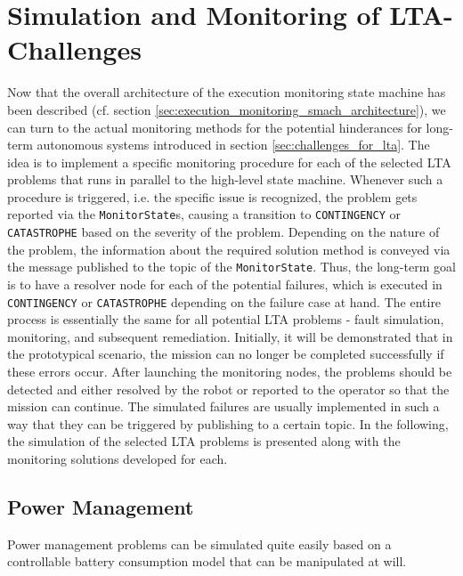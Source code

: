 \documentclass[english, master, utf8]{base/thesis_KBS}
\newcommand{\code}[1]{\colorbox{light-gray}{\texttt{#1}}}
\begin{document}
\section{Simulation and Monitoring of LTA-Challenges}
\label{sec:sim_and_mon_of_lta_challenges}

Now that the overall architecture of the execution monitoring state machine has been described (cf. section \ref{sec:execution_monitoring_smach_architecture}), we can turn to the
actual monitoring methods for the potential hinderances for long-term autonomous systems introduced in section \ref{sec:challenges_for_lta}. The idea is to implement a specific
monitoring procedure for each of the selected LTA problems that runs in parallel to the high-level state machine. Whenever such a procedure is triggered, i.e. the specific issue
is recognized, the problem gets reported via the \code{MonitorState}s, causing a transition to \code{CONTINGENCY} or \code{CATASTROPHE} based on the severity of the problem.
Depending on the nature of the problem, the information about the required solution method is conveyed via the message published to the topic of the \code{MonitorState}.
Thus, the long-term goal is to have a resolver node for each of the potential failures, which is executed in \code{CONTINGENCY} or \code{CATASTROPHE} depending on the
failure case at hand. The entire process is essentially the same for all potential LTA problems - fault simulation, monitoring, and subsequent remediation. 
Initially, it will be demonstrated that in the prototypical scenario, the mission can no longer be completed successfully if these errors occur.
After launching the monitoring nodes, the problems should be detected and either resolved by the robot or reported to the operator so that the mission can continue.
The simulated failures are usually implemented in such a way that they can be triggered by publishing to a certain topic. In the following, the simulation of the selected
LTA problems is presented along with the monitoring solutions developed for each.

\subsection{Power Management}
\label{sec:sim_and_mon_power_management}

Power management problems can be simulated quite easily based on a controllable battery consumption model that can be manipulated at will.

\pagebreak
\end{document}
